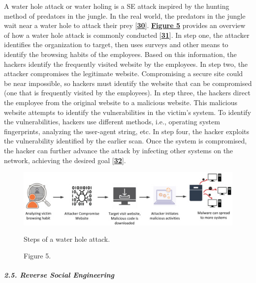A water hole attack or water holing is a SE attack inspired by the hunting method of predators in the jungle. In the real world, the predators in the jungle wait near a water hole to attack their prey [\href{https://www.mdpi.com/2076-3417/12/12/6042\#B30-applsci-12-06042}{\textbf{30}}]. \href{https://www.mdpi.com/2076-3417/12/12/6042\#fig_body_display_applsci-12-06042-f005}{\textbf{Figure 5}} provides an overview of how a water hole attack is commonly conducted [\href{https://www.mdpi.com/2076-3417/12/12/6042\#B31-applsci-12-06042}{\textbf{31}}]. In step one, the attacker identifies the organization to target, then uses surveys and other means to identify the browsing habits of the employees. Based on this information, the hackers identify the frequently visited website by the employees. In step two, the attacker compromises the legitimate website. Compromising a secure site could be near impossible, so hackers must identify the website that can be compromised (one that is frequently visited by the employees). In step three, the hackers direct the employee from the original website to a malicious website. This malicious website attempts to identify the vulnerabilities in the victim’s system. To identify the vulnerabilities, hackers use different methods, i.e., operating system fingerprints, analyzing the user-agent string, etc. In step four, the hacker exploits the vulnerability identified by the earlier scan. Once the system is compromised, the hacker can further advance the attack by infecting other systems on the network, achieving the desired goal [\href{https://www.mdpi.com/2076-3417/12/12/6042\#B32-applsci-12-06042}{\textbf{32}}].


 \begin{figure}
    \justifying
     \includegraphics[width=0.75\linewidth]{waterhole.png}
     \caption{Figure 5.} Steps of a water hole attack.
     \label{fig:placeholder}
 \end{figure}
 
\paragraph{\textit{2.5. Reverse Social Engineering}}

